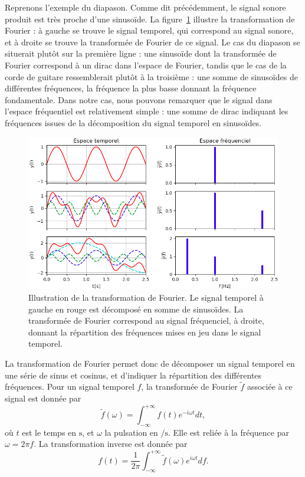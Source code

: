 \documentclass[11pt, twoside, a4paper, openright]{report}
\begin{document}
Reprenons l'exemple du diapason. Comme dit précédemment, le signal sonore produit est très proche d'une sinusoïde. La figure~\ref{fig:example_tf} illustre la transformation de Fourier : à gauche se trouve le signal temporel, qui correspond au signal sonore, et à droite se trouve la transformée de Fourier de ce signal. Le cas du diapason se situerait plutôt sur la première ligne : une sinusoïde dont la transformée de Fourier correspond à un dirac dans l'espace de Fourier, tandis que le cas de la corde de guitare ressemblerait plutôt à la troisième : une somme de sinusoïdes de différentes fréquences, la fréquence la plus basse donnant la fréquence fondamentale. Dans notre cas, nous pouvons remarquer que le signal dans l'espace fréquentiel est relativement simple : une somme de dirac indiquant les fréquences issues de la décomposition du signal temporel en sinusoïdes.
\begin{figure}[h]
  \centering
  \includegraphics[scale=0.5]{example_tf}
  \caption{Illustration de la transformation de Fourier. Le signal temporel à gauche en rouge est décomposé en somme de sinusoïdes. La transformée de Fourier correspond au signal fréquenciel, à droite, donnant la répartition des fréquences mises en jeu dans le signal temporel.}
  \label{fig:example_tf}
\end{figure}

La transformation de Fourier permet donc de décomposer un signal temporel en une série de sinus et cosinus, et d'indiquer la répartition des différentes fréquences. Pour un signal temporel $f$, la transformée de Fourier $\tilde f$ associée à ce signal est donnée par
\begin{equation}
  \label{eq:def_tf}
  \tilde f(\omega) = \int_{-\infty}^{+\infty}f(t) e^{- i \omega t} dt ,
\end{equation}
où $t$ est le temps en $\si{\second}$, et $\omega$ la pulsation en $\si{\per\second}$. Elle est reliée à la fréquence par $\omega = 2 \pi f$. La transformation inverse est donnée par
\begin{equation}
  \label{eq:def_tf_inv}
   f(t) = \frac{1}{2 \pi}\int_{-\infty}^{+\infty} \tilde f(\omega) e^{ i \omega t} df .
\end{equation}
\end{document}
